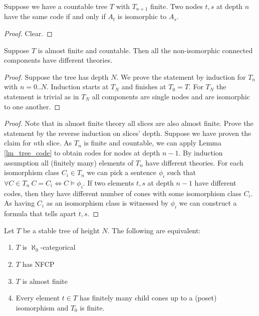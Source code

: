 \documentclass{amsart}
\begin{document}
\begin{Lemma} \label{lm_tree_code}
	Suppose we have a countable tree $T$ with $T_{n+1}$ finite. Two nodes $t,s$ at depth $n$ have the same code if and only if $A_t$ is isomorphic to $A_s$.
\end{Lemma}

\begin{proof}
	Clear.
\end{proof}

\begin{Lemma} \label{lm_categoricity}
	Suppose $T$ is almost finite and countable. Then all the non-isomorphic connected components have different theories.
\end{Lemma}

\begin{proof}
	Suppose the tree has depth $N$. We prove the statement by induction for $T_n$ with $n = 0..N$. Induction starts at $T_N$ and finishes at $T_0 = T$. For $T_N$ the statement is trivial as in $T_N$ all components are single nodes and are isomorphic to one another.
\end{proof}

\begin{proof}
	Note that in almost finite theory all slices are also almost finite. Prove the statement by the reverse induction on slices' depth. Suppose we have proven the claim for $n$th slice. As $T_n$ is finite and countable, we can apply Lemma \ref{lm_tree_code} to obtain codes for nodes at depth $n-1$. By induction assumption all (finitely many) elements of $T_n$ have different theories. For each isomorphism class $C_i \in T_n$ we can pick a sentence $\phi_i$ such that $\forall C \in T_n \  C = C_i \iff C \models \phi_i$. If two elements $t,s$ at depth $n-1$ have different codes, then they have different number of cones with some isomorphism class $C_i$. As having $C_i$ as an isomorphism class is witnessed by $\phi_i$ we can construct a formula that tells apart $t,s$.
\end{proof}

\begin{Theorem} \label{th_tree_nfcp}
	Let $T$ be a stable tree of height $N$. The following are equivalent:
	\begin{enumerate}
		\item $T$ is $\aleph_0$-categorical
		\item $T$ has NFCP
		\item $T$ is almost finite
		\item Every element $t \in T$ has finitely many child cones up to a (poset) isomorphism and $T_0$ is finite.
	\end{enumerate}
\end{Theorem}
\end{document}
